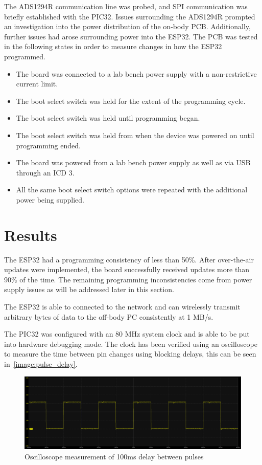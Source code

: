 The ADS1294R communication line was probed, and SPI communication was briefly established with the PIC32.
Issues surrounding the ADS1294R prompted an investigation into the power distribution of the on-body PCB.
Additionally, further issues had arose surrounding power into the ESP32.
The PCB was tested in the following states in order to measure changes in how the ESP32 programmed.

\begin{itemize}
        \item The board was connected to a lab bench power supply with a non-restrictive current limit.
        \item The boot select switch was held for the extent of the programming cycle.
        \item The boot select switch was held until programming began.
        \item The boot select switch was held from when the device was powered on until programming ended.
        \item The board was powered from a lab bench power supply as well as via USB through an ICD 3.
        \item All the same boot select switch options were repeated with the additional power being supplied.
\end{itemize}


\section{Results}
The ESP32 had a programming consistency of less than 50\%.
After over-the-air updates were implemented, the board successfully received updates more than 90\% of the time.
The remaining programming inconsistencies come from power supply issues as will be addressed later in this section.

The ESP32 is able to connected to the network and can wirelessly transmit arbitrary bytes of data to the off-body PC consistently at 1 MB/s.

The PIC32 was configured with an 80 MHz system clock and is able to be put into hardware debugging mode.
The clock has been verified using an oscilloscope to measure the time between pin changes using blocking delays,
this can be seen in~\autoref{image:pulse_delay}.

\begin{figure}[!ht]
  \caption{Oscilloscope measurement of 100ms delay between pulses}\label{image:pulse_delay}
  \centering
  \includegraphics[width=1\columnwidth]{chapters/development/results/DELAY}
\end{figure}

